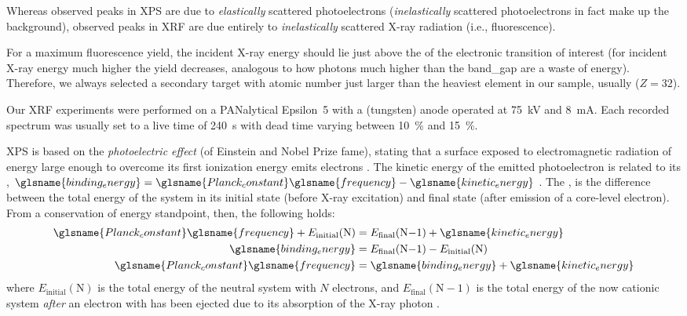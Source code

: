 \documentclass[draft,webedition,openright,titles,swedish,english]{LuaUUThesis}\usepackage[]{graphicx}\usepackage[]{xcolor}
\newcommand{\ie}{i.e.}
\begin{document}
Whereas observed peaks in \gls{XPS} are due to \emph{elastically}
scattered photoelectrons (\emph{inelastically} scattered photoelectrons in fact
make up the background), observed peaks in \gls{XRF} are due entirely to
\emph{inelastically} scattered X-ray radiation (\ie, fluorescence).

For a maximum fluorescence yield, the incident X-ray energy should
lie just above the  of the electronic transition
of interest (for incident X-ray energy much higher the yield decreases, analogous
to how photons much higher than the \gls{band_gap} are a waste of energy).
Therefore, we always selected a secondary target with atomic number just larger
than the heaviest element in our sample, usually  ($Z=\num{32}$).

Our \gls{XRF} experiments were performed on a
PANalytical Epsilon~5 with a  (tungsten) anode
operated at \qty{75}{\kV} and \qty{8}{\mA}.
Each recorded spectrum was usually set to a live time of \qty{240}{\second}
with dead time varying between \qty{10}{\percent} and \qty{15}{\percent}.

\Gls{XPS} is based on the \emph{photoelectric effect} (of Einstein and Nobel Prize fame),
stating that a surface exposed to electromagnetic radiation of energy large enough
to overcome its first ionization energy emits electrons \cite{Einstein1905}.
The kinetic energy of the emitted photoelectron is related to its ,
$\glsname{binding_energy} = \glsname{Planck_constant}\glsname{frequency} - \glsname{kinetic_energy}$
\cite{Einstein1905}.
The , is the difference between the total energy of the system
in its initial state (before X-ray excitation) and final state (after emission of a core-level electron).
From a conservation of energy standpoint, then, the following holds:
\begin{align}\begin{split}\label{eq:xps}
\glsname{Planck_constant}\glsname{frequency} + E_\mathrm{initial}(\mathrm{N}) &= E_\mathrm{final}(\mathrm{N}{-}1) + \glsname{kinetic_energy}\\
\glsname{binding_energy} &= E_\mathrm{final}(\mathrm{N}{-}1) - E_\mathrm{initial}(\mathrm{N})\\
\glsname{Planck_constant}\glsname{frequency} &= \glsname{binding_energy} + \glsname{kinetic_energy}
\end{split}\end{align}
where $E_\mathrm{initial}(\mathrm{N})$ is the total energy of the neutral system with
$N$ electrons, and $E_\mathrm{final}(\mathrm{N}{-}1)$ is the total energy of the
now cationic system \emph{after} an electron with  has been ejected
due to its absorption of the X-ray photon .
\end{document}
